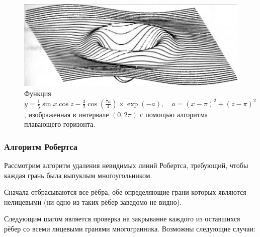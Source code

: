 \begin{figure}[H]
    \centering
    \includegraphics[width=\textwidth]{img/floating_horizon_7.png}
    \caption{Функция \( y = \frac{1}{5} \sin x \cos z - \frac{3}{2} \cos \left( \frac{7a}{4} \right) \times \exp(-a), \quad a = (x - \pi)^2 + (z - \pi)^2 \), изображенная в интервале \( (0, 2\pi) \) с помощью алгоритма плавающего горизонта.}
    \label{fig:floating_horizon_7}
\end{figure}



\subsubsection{Алгоритм Робертса}

\hspace{1.25cm}
Рассмотрим алгоритм удаления невидимых линий Робертса, требующий, чтобы каждая грань была выпуклым многоугольником.

Сначала отбрасываются все рёбра, обе определяющие грани которых являются нелицевыми (ни одно из таких рёбер заведомо не видно).

Следующим шагом является проверка на закрывание каждого из оставшихся рёбер со всеми лицевыми гранями многогранника. Возможны следующие случаи:


